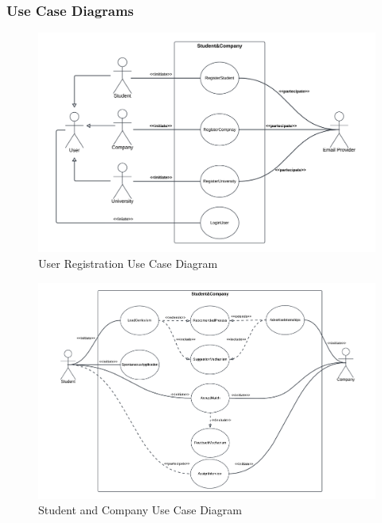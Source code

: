 \subsubsection{Use Case Diagrams}
\begin{figure}[H]
    \centering
    \includegraphics[width=1 \textwidth]{Diagrams/UseDiagrams/UserRegistrationUseCase.png}
    \caption{User Registration Use Case Diagram}
    \label{fig:UserRegistrationUseCaseDiagram}
\end{figure}
\begin{figure}[H]
    \centering
    \includegraphics[width=1 \textwidth]
    {Diagrams/UseDiagrams/Student Company Use Case.png}
    \caption{Student and Company Use Case Diagram}
    \label{fig:StudentCompanyUseCaseDiagram}
\end{figure}
